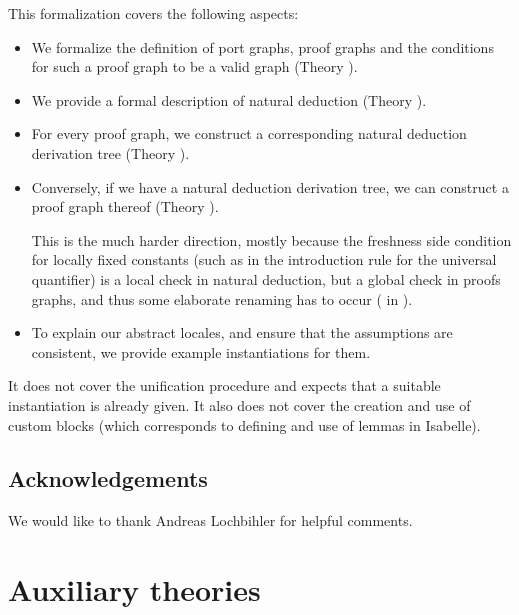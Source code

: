 \documentclass[11pt,a4paper,parskip=half]{scrartcl}
\begin{document}
This formalization covers the following aspects:
\begin{itemize}
\item We formalize the definition of port graphs, proof graphs and the conditions for such a proof
      graph to be a valid graph (Theory ).
\item We provide a formal description of natural deduction (Theory ).
\item For every proof graph, we construct a corresponding natural deduction derivation tree
      (Theory  ).
\item Conversely, if we have a natural deduction derivation tree, we can construct a proof graph
      thereof (Theory ).
      
      This is the much harder direction, mostly because the freshness side condition for locally
      fixed constants (such as in the introduction rule for the universal quantifier) is a local
      check in natural deduction, but a global check in proofs graphs, and thus some elaborate
      renaming has to occur ( in ).
\item To explain our abstract locales, and ensure that the assumptions are consistent, we provide
      example instantiations for them.
\end{itemize}

It does not cover the unification procedure and expects that a suitable instantiation is already
given. It also does not cover the creation and use of custom blocks (which corresponds to defining 
and use of lemmas in Isabelle).


\subsection*{Acknowledgements}

We would like to thank Andreas Lochbihler for helpful comments.




\clearpage
\newcommand{\theory}[1]{\subsection{#1}\label{sec\string_#1}}

\section{Auxiliary theories}
\label{ch\string_aux}
\end{document}
